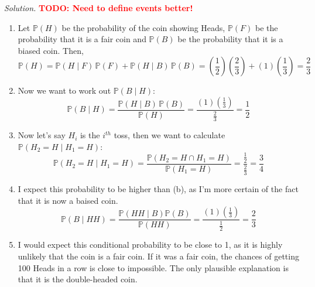 \documentclass[11pt]{article}
\newenvironment{solution}{%
  \noindent\textit{Solution.}\quad
}{\par\bigskip}
\begin{document}
\begin{solution} \textcolor{red}{\textbf{TODO: Need to define events better!}}
\begin{enumerate}
      \item Let $\mathbb{P}(H)$ be the probability of the coin showing Heads, 
            $\mathbb{P}(F)$ be the probability that it is a fair coin and 
            $\mathbb{P}(B)$ be the probability that it is a biased coin. Then, 
            \[
            \mathbb{P}(H) = \mathbb{P}(H \mid F) \, \mathbb{P}(F) + 
                              \mathbb{P}(H \mid B) \, \mathbb{P}(B)
                          = \left(\frac{1}{2}\right) \left(\frac{2}{3}\right)
                              + \left(1\right) \left(\frac{1}{3}\right)
                          = \frac{2}{3}
            \]
      \item Now we want to work out $\mathbb{P}(B \mid H)$:
            \[
            \mathbb{P}(B \mid H) = \frac{\mathbb{P}(H \mid B) \, \mathbb{P}(B)}{\mathbb{P}(H)}
                        = \frac{\left(1\right) \left(\frac{1}{3}\right)}
                              {\frac{2}{3}}
                        = \frac{1}{2}
            \]
      \item Now let's say $H_i$ is the $i^{th}$ toss, then we want to calculate 
            $\mathbb{P}(H_2 = H \mid H_1 = H)$:
            \[
            \mathbb{P}(H_2 = H \mid H_1 = H) = \frac{\mathbb{P}(H_2 = H \cap H_1 = H)}
                        {\mathbb{P}(H_1 = H)} = \frac{\frac{1}{2}}{\frac{2}{3}}
                        = \frac{3}{4}
            \]
      \item I expect this probability to be higher than (b), as I'm more certain 
            of the fact that it is now a baised coin.
            \[
            \mathbb{P}(B \mid HH) = \frac{\mathbb{P}(HH \mid B) \mathbb{P}(B)}{\mathbb{P}(HH)}
                        = \frac{\left(1\right) \left(\frac{1}{3}\right)}
                              {\frac{1}{2}} = \frac{2}{3}
            \]
      \item I would expect this conditional probability to be close to 1, as it 
            is highly unlikely that the coin is a fair coin. If it was a fair coin, 
            the chances of getting 100 Heads in a row is close to impossible. The 
            only plausible explanation is that it is the double-headed coin. 
\end{enumerate}
\end{solution}
\end{document}
